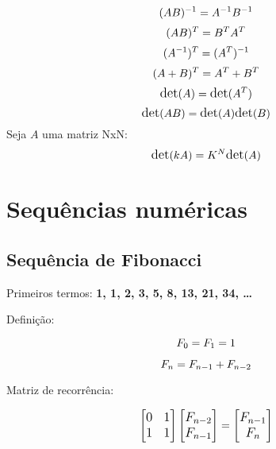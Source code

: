 \documentclass[10pt, a4paper, oneside]{book}
\begin{document}
\begin{equation*} 
\large (AB)^{-1} = A^{-1}B^{-1}\\
\end{equation*}
\begin{equation*} 
\large (AB)^{T} = B^{T}A^{T} \\
\end{equation*}
\begin{equation*} 
\large (A^{-1})^{T} = (A^{T})^{-1} \\
\end{equation*}
\begin{equation*} 
\large (A+B)^{T} = A^{T} + B^{T} \\
\end{equation*}
\begin{equation*} 
\large \text{det}(A) = \text{det}(A^{T}) \\
\end{equation*}
\begin{equation*} 
\large \text{det}(AB) = \text{det}(A)\text{det}(B) \\
\end{equation*}
{\large Seja $A$ uma matriz NxN:}
\begin{equation*} 
\large \text{det}(kA) = K^N\text{det}(A) \\
\end{equation*}

\section{Sequências numéricas}

\subsection{Sequência de Fibonacci}

Primeiros termos: \textbf{1, 1, 2, 3, 5, 8, 13, 21, 34, \ldots}

Definição:

\begin{equation*}
\large
F_0 = F_1 = 1
\end{equation*}

\begin{equation*}
\large
F_n = F_{n-1} + F_{n-2}
\end{equation*}

Matriz de recorrência:

\begin{equation*}
\large
\begin{bmatrix}
    0 & 1 \\
    1 & 1
\end{bmatrix}
\begin{bmatrix}
    F_{n-2} \\
    F_{n-1}
\end{bmatrix}
=
\begin{bmatrix}
    F_{n-1} \\
    F_n
\end{bmatrix}
\end{equation*}
\end{document}
